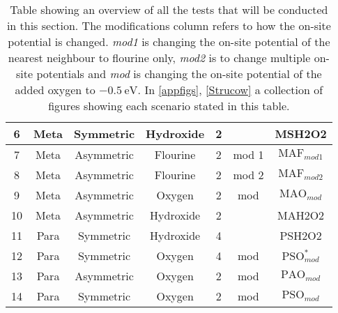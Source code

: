 \begin{table}[ht]
\begin{tabular}{|c|c|c|c|c|c|c|}
6                              & Meta                           & Symmetric                                 & Hydroxide                         & 2              &                                    & MSH2O2                              \\ \hline
7                              & Meta                           & Asymmetric                                & Flourine                     & 2              & mod 1                              & \(\text{MAF}_{mod1}\)                       \\ \hline
8                              & Meta                           & Asymmetric                                & Flourine                     & 2              & mod 2                              & \(\text{MAF}_{mod2}\)                       \\ \hline
9                              & Meta                           & Asymmetric                                & Oxygen                       & 2              & mod                                & \(\text{MAO}_{mod}\)                        \\ \hline
10                             & Meta                           & Asymmetric                                & Hydroxide                         & 2              &                                    & MAH2O2                              \\ \hline
11                             & Para                           & Symmetric                                 & Hydroxide                         & 4              &                                    & PSH2O2                              \\ \hline
12                             & Para                           & Symmetric                                 & Oxygen                       & 4              & mod                                & \(\text{PSO}^{*}_{mod}\) \\ \hline
13                             & Para                           & Asymmetric                                & Oxygen                       & 2              & mod                                & \(\text{PAO}_{mod}\)                        \\ \hline
14                             & Para                           & Symmetric                                 & Oxygen                       & 2              & mod                                & \(\text{PSO}_{mod}\)                        \\ \hline
\end{tabular}
\caption{Table showing an overview of all the tests that will be conducted in this section. The modifications column refers to how the on-site potential is changed. \textit{mod1} is changing the on-site potential of the nearest neighbour to flourine only, \textit{mod2} is to change multiple on-site potentials and \textit{mod} is changing the on-site potential of the added oxygen to \(\SI{-0.5}{\electronvolt}\). In \cref{appfigs}, \cref{Strucow} a collection of figures showing each scenario stated in this table.}
\label{testtable}
\end{table}
